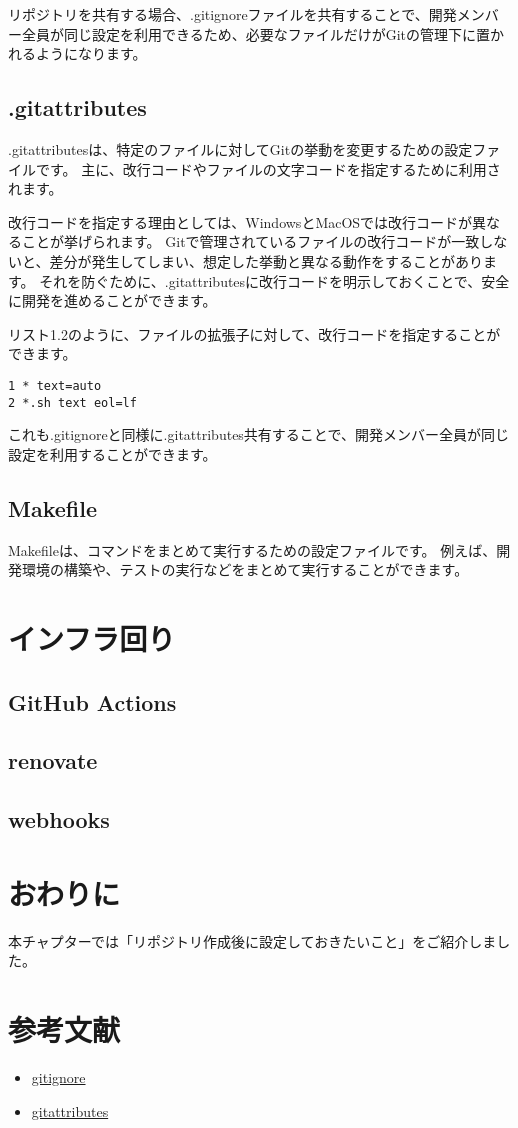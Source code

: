 リポジトリを共有する場合、.gitignoreファイルを共有することで、開発メンバー全員が同じ設定を利用できるため、必要なファイルだけがGitの管理下に置かれるようになります。

\subsection{.gitattributes}

.gitattributesは、特定のファイルに対してGitの挙動を変更するための設定ファイルです。
主に、改行コードやファイルの文字コードを指定するために利用されます。

改行コードを指定する理由としては、WindowsとMacOSでは改行コードが異なることが挙げられます。
Gitで管理されているファイルの改行コードが一致しないと、差分が発生してしまい、想定した挙動と異なる動作をすることがあります。
それを防ぐために、.gitattributesに改行コードを明示しておくことで、安全に開発を進めることができます。

リスト1.2のように、ファイルの拡張子に対して、改行コードを指定することができます。

\begin{tcolorbox}[title=リスト1.2 .gitattributes]
  \begin{verbatim}
1 * text=auto
2 *.sh text eol=lf
\end{verbatim}
\end{tcolorbox}

これも.gitignoreと同様に.gitattributes共有することで、開発メンバー全員が同じ設定を利用することができます。


\subsection{Makefile}

Makefileは、コマンドをまとめて実行するための設定ファイルです。
例えば、開発環境の構築や、テストの実行などをまとめて実行することができます。




\section{インフラ回り}

\subsection{GitHub Actions}
\subsection{renovate}
\subsection{webhooks}


\section{おわりに}
本チャプターでは「リポジトリ作成後に設定しておきたいこと」をご紹介しました。

\section{参考文献}
\begin{itemize}
  \item \href{https://git-scm.com/docs/gitignore}{gitignore}
  \item \href{https://git-scm.com/docs/gitattributes}{gitattributes}
\end{itemize}
